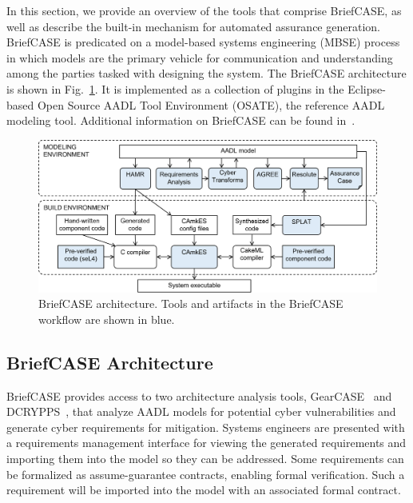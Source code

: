 In this section, we provide an overview of the tools that comprise BriefCASE, as well as describe the built-in mechanism for automated assurance generation.
BriefCASE is predicated on a model-based systems engineering (MBSE) process in which models are the primary vehicle for communication and understanding among the parties tasked with designing the system. 
The BriefCASE architecture is shown in Fig.~\ref{fig:briefcase-architecture}.
It is implemented as a collection of plugins in the Eclipse-based Open Source AADL Tool Environment (OSATE), the reference AADL modeling tool.   
Additional information on BriefCASE can be found in~\cite{case-at-scale}.

\begin{figure}[h] 
	\centering 
	\includegraphics[width=\textwidth]{figs/briefcase-architecture.png}
	\caption{BriefCASE architecture. Tools and artifacts in the BriefCASE workflow are shown in blue.}
	\label{fig:briefcase-architecture} 
\end{figure}

\subsection{BriefCASE Architecture}

BriefCASE provides access to two architecture analysis tools, GearCASE~\cite{gearcase2020} and DCRYPPS~\cite{dcrypps2019}, that analyze AADL models for potential cyber vulnerabilities and generate cyber requirements for mitigation. 
Systems engineers are presented with a requirements management interface for viewing the generated requirements and importing them into the model so they can be addressed.  
Some requirements can be formalized as assume-guarantee contracts, enabling formal verification. Such a requirement will be imported into the model with an associated formal contract.

